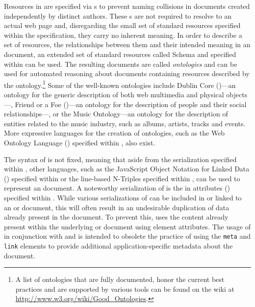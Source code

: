 \documentclass{book}
\begin{document}
        Resources in  are specified via s to prevent
        naming collisions in  documents created independently by
        distinct authors. These s are not required to resolve to an
        actual web page and, disregarding the small set of standard resources
        specified within the  specification, they carry no inherent
        meaning.  In order to describe a set of resources, the relationships
        between them and their intended meaning in an  document, an
        extended set of standard resources called  Schema and
        specified within \cite{brickley04} can be used. The resulting documents
        are called \emph{ontologies} and can be used for automated reasoning
        about  documents containing resources described by the
        ontology.\footnote{
          A list of ontologies that are fully documented, honor the current best
          practices and are supported by various tools can be found on the
           wiki at \url{http://www.w3.org/wiki/Good_Ontologies}.
        } Some of the well-known ontologies include Dublin
        Core ()---an ontology for the generic description of both
        web multimedia and physical objects---, Friend or a Foe
        ()---an ontology for the description of people and their
        social relationships---, or the Music Ontology---an ontology for the
        description of entities related to the music industry, such as albums,
        artists, tracks and events. More expressive languages for the creation
        of ontologies, such as the Web Ontology Language ()
        specified within \cite{mcguinness04}, also exist.

        The syntax of  is not fixed, meaning that aside from the
         serialization specified within \cite{lassira99}, other
        languages, such as the JavaScript Object Notation for Linked Data
        () specified within \cite{sporny14} or the line-based
        N-Triples specified within \cite{beckett14}, can be used to represent an
         document. A noteworthy serialization of  is
        the  in attributes () specified within
        \cite{adida08}. While various serializations of  can be
        included in or linked to an  or  document,
        this will often result in an undesirable duplication of data already
        present in the document. To prevent this,  uses the
        content already present within the underlying  or
         document using element attributes. The usage of
         in conjunction with  and  is
        intended to obsolete the practice of using the \texttt{meta} and
        \texttt{link} elements to provide additional application-specific
        metadata about the document.
\end{document}
